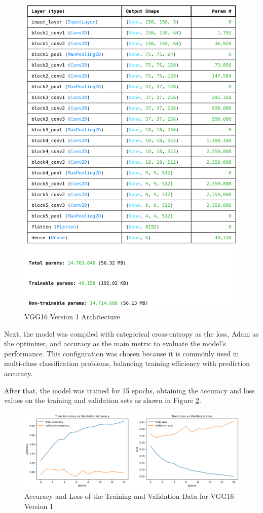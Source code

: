 \documentclass[conference]{IEEEtran}
\begin{document}
\begin{figure}[H]
    \centering
    \includegraphics[width=0.85\linewidth]{images/archVGG16_1.png}
    \caption{VGG16 Version 1 Architecture}
    \label{fig:archVGG16_1}
\end{figure}

Next, the model was compiled with categorical cross-entropy as the loss, Adam as the optimizer, and accuracy as the main metric to evaluate the model's performance. This configuration was chosen because it is commonly used in multi-class classification problems, balancing training efficiency with prediction accuracy.

After that, the model was trained for 15 epochs, obtaining the accuracy and loss values on the training and validation sets as shown in Figure \ref{fig:acc&lossVGG16_1}.

\begin{figure}[H]
    \centering
    \includegraphics[width=0.9\linewidth]{images/acc&lossVGG16_1.png}
    \caption{Accuracy and Loss of the Training and Validation Data for VGG16 Version 1}
    \label{fig:acc&lossVGG16_1}
\end{figure}
\end{document}
